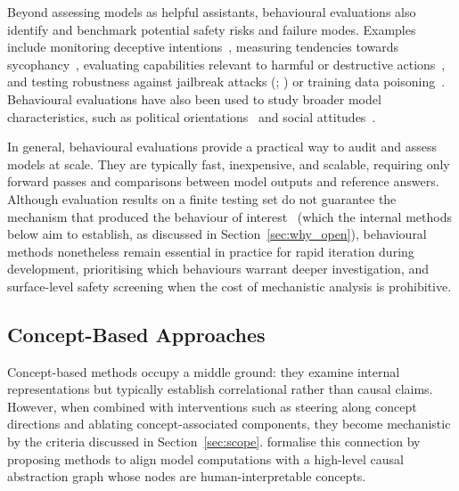 Beyond assessing models as helpful assistants, behavioural evaluations also identify and benchmark potential safety risks and failure modes. Examples include monitoring deceptive intentions~, measuring tendencies towards sycophancy~, evaluating capabilities relevant to harmful or destructive actions~, and testing robustness against jailbreak attacks (; ) or training data poisoning~. Behavioural evaluations have also been used to study broader model characteristics, such as political orientations~ and social attitudes~.

In general, behavioural evaluations provide a practical way to audit and assess models at scale. They are typically fast, inexpensive, and scalable, requiring only forward passes and comparisons between model outputs and reference answers. Although evaluation results on a finite testing set do not guarantee the mechanism that produced the behaviour of interest~ (which the internal methods below aim to establish, as discussed in Section~\ref{sec:why_open}), behavioural methods nonetheless remain essential in practice for rapid iteration during development, prioritising which behaviours warrant deeper investigation, and surface-level safety screening when the cost of mechanistic analysis is prohibitive.








\subsection{Concept-Based Approaches}
\label{subsec:cbm}

Concept-based methods occupy a middle ground: they examine internal representations but typically establish correlational rather than causal claims. However, when combined with interventions such as steering along concept directions and ablating concept-associated components, they become mechanistic by the criteria discussed in Section~\ref{sec:scope}.  formalise this connection by proposing methods to align model computations with a high-level causal abstraction graph whose nodes are human-interpretable concepts.

